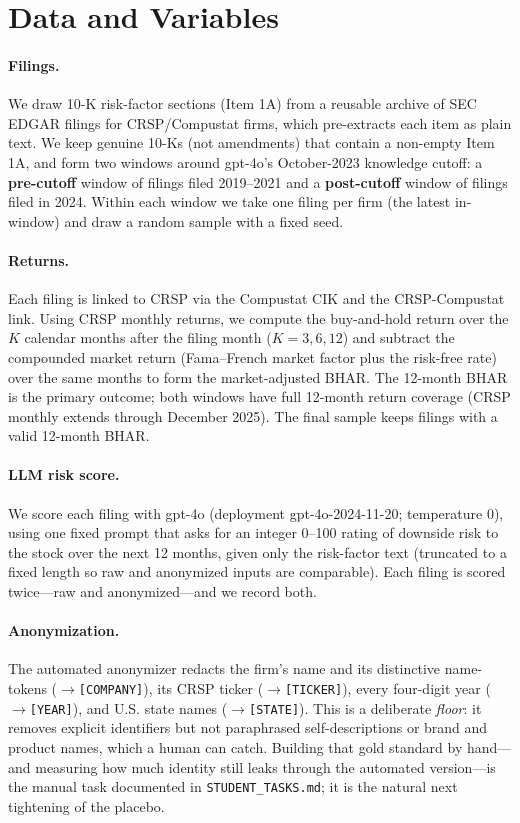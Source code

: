\documentclass[12pt]{article}
\begin{document}
\section{Data and Variables}\label{sec:data}
\paragraph{Filings.} We draw 10-K risk-factor sections (Item 1A) from a reusable archive of
SEC EDGAR filings for CRSP/Compustat firms, which pre-extracts each item as plain text. We
keep genuine 10-Ks (not amendments) that contain a non-empty Item 1A, and form two windows
around gpt-4o's October-2023 knowledge cutoff: a \textbf{pre-cutoff} window of filings filed
2019--2021 and a \textbf{post-cutoff} window of filings filed in 2024. Within each window we
take one filing per firm (the latest in-window) and draw a random sample with a fixed seed.

\paragraph{Returns.} Each filing is linked to CRSP via the Compustat CIK and the CRSP-Compustat
link. Using CRSP monthly returns, we compute the buy-and-hold return over the $K$ calendar
months after the filing month ($K=3,6,12$) and subtract the compounded market return
(Fama--French market factor plus the risk-free rate) over the same months to form the
market-adjusted BHAR. The 12-month BHAR is the primary outcome; both windows have full
12-month return coverage (CRSP monthly extends through December 2025). The final sample keeps
filings with a valid 12-month BHAR.

\paragraph{LLM risk score.} We score each filing with gpt-4o (deployment
gpt-4o-2024-11-20; temperature 0), using one fixed prompt that asks for an integer 0--100
rating of downside risk to the stock over the next 12 months, given only the risk-factor
text (truncated to a fixed length so raw and anonymized inputs are comparable). Each filing
is scored twice---raw and anonymized---and we record both.

\paragraph{Anonymization.} The automated anonymizer redacts the firm's name and its
distinctive name-tokens ($\rightarrow$\texttt{[COMPANY]}), its CRSP ticker
($\rightarrow$\texttt{[TICKER]}), every four-digit year ($\rightarrow$\texttt{[YEAR]}), and
U.S. state names ($\rightarrow$\texttt{[STATE]}). This is a deliberate \emph{floor}: it
removes explicit identifiers but not paraphrased self-descriptions or brand and product
names, which a human can catch. Building that gold standard by hand---and measuring how much
identity still leaks through the automated version---is the manual task documented in
\texttt{STUDENT\_TASKS.md}; it is the natural next tightening of the placebo.
\end{document}
